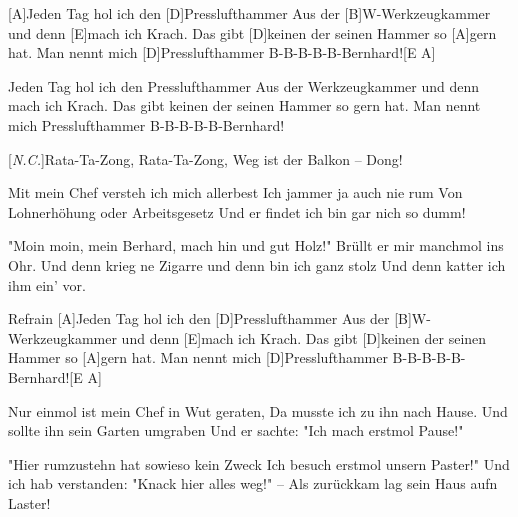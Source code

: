 \begin{guitar}
	
	[A]Jeden Tag hol ich den [D]Presslufthammer
	Aus der [B]W-Werkzeugkammer und denn [E]mach ich Krach.
	Das gibt [D]keinen der seinen Hammer so [A]gern hat.
	Man nennt mich [D]Presslufthammer B-B-B-B-B-Bernhard![E A]{}
	
	Jeden Tag hol ich den Presslufthammer
	Aus der Werkzeugkammer und denn mach ich Krach.
	Das gibt keinen der seinen Hammer so gern hat.
	Man nennt mich Presslufthammer B-B-B-B-B-Bernhard!
	
	[\textit{N.C.}]Rata-Ta-Zong, Rata-Ta-Zong, Weg ist der Balkon – Dong!
	
	Mit mein Chef versteh ich mich allerbest
	Ich jammer ja auch nie rum
	Von Lohnerhöhung oder Arbeitsgesetz
	Und er findet ich bin gar nich so dumm!
	
	"Moin moin, mein Berhard, mach hin und gut Holz!"
	Brüllt er mir manchmol ins Ohr.
	Und denn krieg ne Zigarre und denn bin ich ganz stolz
	Und denn katter ich ihm ein' vor.
	
  \begin{chorus}{Refrain}
	[A]Jeden Tag hol ich den [D]Presslufthammer
	Aus der [B]W-Werkzeugkammer und denn [E]mach ich Krach.
	Das gibt [D]keinen der seinen Hammer so [A]gern hat.
	Man nennt mich [D]Presslufthammer B-B-B-B-B-Bernhard![E A]{}%
  \end{chorus}
	
	Nur einmol ist mein Chef in Wut geraten,
	Da musste ich zu ihn nach Hause.
	Und sollte ihn sein Garten umgraben
	Und er sachte: "Ich mach erstmol Pause!"
	
	"Hier rumzustehn hat sowieso kein Zweck
	Ich besuch erstmol unsern Paster!"
	Und ich hab verstanden: "Knack hier alles weg!" –
	Als zurückkam lag sein Haus aufn Laster!
	
	 
\end{guitar}
